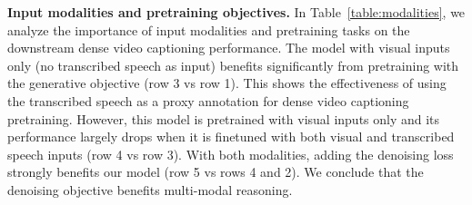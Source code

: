 \begin{table}[t]
\centering
\vspace{-0pt}
\begin{center}
\setlength\tabcolsep{4pt}
\vspace{-0.3cm}
\caption{\small\textbf{Effect of language model size and pretraining data.} HTM: HowTo100M~\cite{miech19howto100m}, YTT: YT-Temporal-1B~\cite{zellers2022merlot}.} 
\vspace{-0.9cm}
\label{table:scale}
\end{center}
\end{table}

\noindent \textbf{Input modalities and pretraining objectives.} 
In Table~\ref{table:modalities}, we analyze the importance of input modalities and pretraining tasks on the downstream dense video captioning performance.
The model with visual inputs only (no transcribed speech as input) benefits significantly from pretraining with the generative objective (row 3 vs row 1).
This shows the effectiveness of using the transcribed speech as a proxy annotation for dense video captioning pretraining.
However, this model is pretrained with visual inputs only and its performance largely drops when it is finetuned with both visual and transcribed speech inputs (row 4 vs row 3).
With both modalities, adding the denoising loss strongly benefits our model (row 5 vs rows 4 and 2).
We conclude that the denoising objective benefits multi-modal reasoning.

